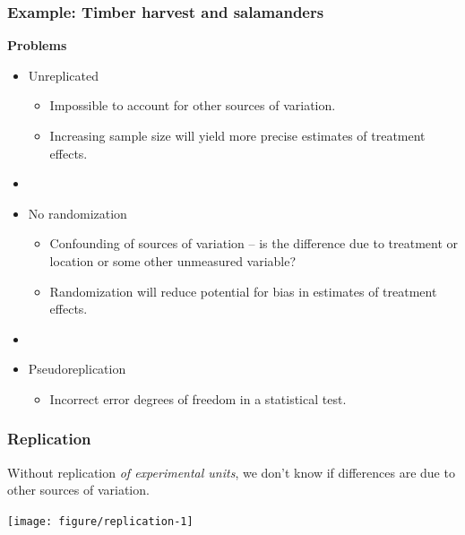\documentclass[color=usenames,dvipsnames]{beamer}\usepackage[]{graphicx}\usepackage[]{color}
\newenvironment{knitrout}{}{} %
\begin{document}
\begin{frame}
  \frametitle{Example: Timber harvest and salamanders}
  {\bf Problems}
  \begin{itemize}
    \item Unreplicated
      \begin{itemize}
      \item Impossible to account for other sources of variation.
      \item Increasing sample size will yield more precise estimates
        of treatment effects.
        \end{itemize}
    \item[]
    \item<2-> No randomization
      \begin{itemize}
        \item Confounding of sources of variation -- is the difference
          due to treatment or location or some other unmeasured variable? 
        \item Randomization will reduce potential for bias in
          estimates of treatment effects.
      \end{itemize}      
    \item[]
    \item<3-> Pseudoreplication
      \begin{itemize}
      \item Incorrect error degrees of freedom in a statistical test.
      \end{itemize}
    \end{itemize}
\end{frame}


\begin{frame}[fragile]
  \frametitle{Replication}
  Without replication {\it of experimental units}, we don't know if
  differences are due to other sources of variation. \\
  \vfill
\begin{knitrout}\scriptsize
{}\color{fgcolor}

{\centering \texttt{[image: figure/replication-1]} 

}


\end{knitrout}
\end{frame}
\end{document}
